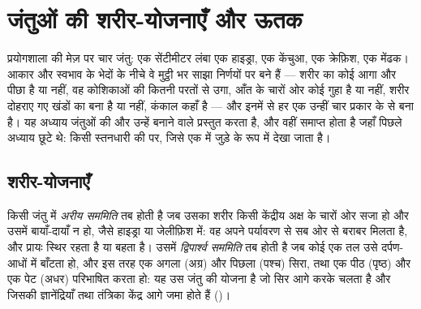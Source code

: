 \chapter{जंतुओं की शरीर-योजनाएँ और ऊतक}\label{ch:b1:body-plans-tissues}

प्रयोगशाला की मेज़ पर चार जंतु: एक सेंटीमीटर लंबा एक हाइड्रा, एक केंचुआ,
एक क्रेफ़िश, एक मेंढक। आकार और स्वभाव के भेदों के नीचे वे मुट्ठी भर साझा
निर्णयों पर बने हैं --- शरीर का कोई आगा और पीछा है या नहीं, वह कोशिकाओं
की कितनी परतों से उगा, आँत के चारों ओर कोई गुहा है या नहीं, शरीर दोहराए
गए खंडों का बना है या नहीं, कंकाल कहाँ है --- और इनमें से हर एक उन्हीं
चार प्रकार के  से बना है। यह अध्याय जंतुओं की  और उन्हें
बनाने वाले  प्रस्तुत करता है, और वहीं समाप्त होता है जहाँ पिछले
अध्याय छूटे थे: किसी स्तनधारी की  पर, जिसे एक  में जुड़े
 के रूप में देखा जाता है।

\section{शरीर-योजनाएँ}

\begin{definition}\label{def:b1:body-plans-tissues:symmetry}
किसी जंतु में \emph{अरीय सममिति} तब होती है जब उसका
शरीर किसी केंद्रीय अक्ष के चारों ओर सजा हो और उसमें बायाँ-दायाँ न हो,
जैसे हाइड्रा या जेलीफ़िश में: वह अपने पर्यावरण से सब ओर से बराबर मिलता
है, और प्रायः स्थिर रहता है या बहता है। उसमें \emph{द्विपार्श्व
सममिति} तब होती है जब कोई एक तल उसे दर्पण-आधों
में बाँटता हो, और इस तरह एक अगला (अग्र) और पिछला (पश्च) सिरा, तथा एक
पीठ (पृष्ठ) और एक पेट (अधर) परिभाषित करता हो: यह उस जंतु की योजना है जो
सिर आगे करके चलता है और जिसकी ज्ञानेंद्रियाँ तथा तंत्रिका केंद्र आगे
जमा होते हैं ()।
\end{definition}

